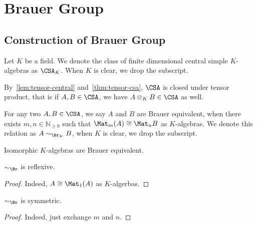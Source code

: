 \chapter{Brauer Group}\label{cha:brauer-group}

\section{Construction of Brauer Group}
Let $K$ be a field. We denote the class of finite dimensional central simple $K$-algebras as $\CSA_{K}$. When $K$ is clear, we drop the subscript.

\begin{remark}
  By~\cref{lem:tensor-central} and~\cref{thm:tensor-csa}, $\CSA$ is closed under tensor product, that is if $A, B\in\CSA$, we have $A\otimes_{K} B\in\CSA$ as well.
\end{remark}

\begin{definition}\label{def:br-eqv}
  For any two $A, B\in\CSA$, we say $A$ and $B$ are Brauer equivalent, when there exists $m, n \in \mathbb{N}_{\ge0}$ such that $\Mat_{m}(A)\cong \Mat_{n}B$ as $K$-algebras. We denote this relation as $A\sim_{\Br_{K}} B$, when $K$ is clear, we drop the subscript.
\end{definition}

\begin{remark}
  Isomorphic $K$-algebras are Brauer equivalent.
\end{remark}

\begin{lemma}
  $\sim_{\Br}$ is reflexive.
  \leanok
\end{lemma}
\begin{proof}
  Indeed, $A \cong \Mat_{1}(A)$ as $K$-algerbas.
\end{proof}

\begin{lemma}
  $\sim_{\Br}$ is symmetric.
  \leanok
\end{lemma}
\begin{proof}
  Indeed, just exchange $m$ and $n$.
\end{proof}

